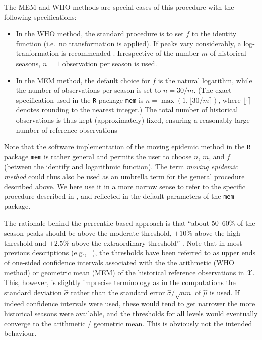 \documentclass{article}
\begin{document}
\noindent The MEM and WHO methods are special cases of this procedure with the following specifications:
\begin{itemize}
\item In the WHO method, the standard procedure is to set $f$ to the identity function (i.e.\ no transformation is applied). If peaks vary considerably, a log-tranformation is recommended \citep{WHO2017}. Irrespective of the number $m$ of historical seasons, $n = 1$ observation per season is used.
\item In the MEM method, the default choice for $f$ is the natural logarithm, while the number of observations per season is set to $n = 30/m$. (The exact specification used in the \texttt{R} package \texttt{mem} is $n = \max(1, \lfloor 30/m \rceil)$, where $\lfloor \cdot \rceil$ denotes rounding to the nearest integer.) The total number of historical observations is thus kept (approximately) fixed, ensuring a reasonably large number of reference observations
\end{itemize}
Note that the software implementation of the moving epidemic method in the \texttt{R} package \texttt{mem} is rather general and permits the user to choose $n$, $m$, and $f$ (between the identify and logarithmic function). The term \textit{moving epidemic method} could thus also be used as an umbrella term for the general procedure described above. We here use it in a more narrow sense to refer to the specific procedure described in \cite{Vega2015}, \cite{WHO2017} and reflected in the default parameters of the \texttt{mem} package.

The rationale behind the percentile-based approach is that ``about 50--60\% of the season peaks should be above the moderate threshold, $\pm 10\%$ above the high threshold and $\pm 2.5\%$ above the extraordinary threshold'' \citep{WHO2017}. Note that in most previous descriptions (e.g., \ \citealt{WHO2014, Vega2015}), the thresholds have been referred to as upper ends of one-sided confidence intervals associated with the the arithmetic (WHO method) or geometric mean (MEM) of the historical reference observations in $\mathcal{X}$. This, however, is slightly imprecise terminology as in the computations the standard deviation $\hat\sigma$ rather than the standard error $\hat\sigma/\sqrt{nm}$ of $\hat\mu$ is used. If indeed confidence intervals were used, these would tend to get narrower the more historical seasons were available, and the thresholds for all levels would eventually converge to the arithmetic / geometric mean. This is obviously not the intended behaviour.
\end{document}
